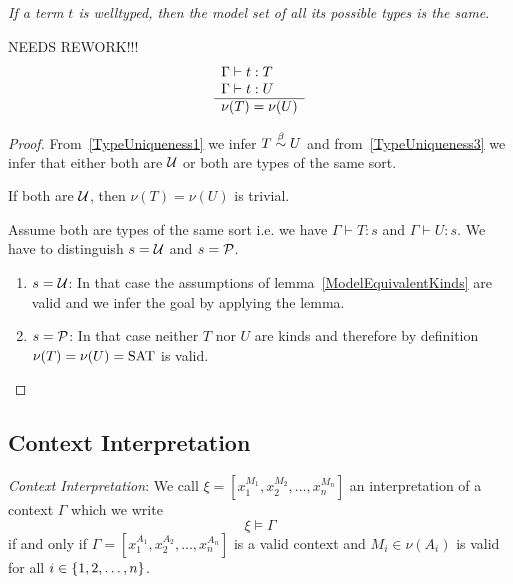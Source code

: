 \begin{theorem}
    \label{ModelAllTypesSame}
    \emph{If a term $t$ is welltyped, then the model set of all its possible
    types is the same}.

    NEEDS REWORK!!!
    $$
    \begin{array}{l} 
        \Gamma \vdash t: T
        \\
        \Gamma \vdash t: U
     \\ \hline 
        \nu(T) = \nu(U)
    \end{array}
    $$

    \begin{proof}
        From~\ref{TypeUniqueness1} we infer $T \stackrel{\beta}{\sim} U$ and
        from~\ref{TypeUniqueness3} we infer that either both are ${\cal U}$ or both
        are types of the same sort.

        If both are ${\cal U}$, then $\nu(T) = \nu(U)$ is trivial.

        Assume both are types of the same sort i.e. we have $\Gamma \vdash T: s$
        and $\Gamma \vdash U: s$. We have to distinguish $s = {\cal U}$ and $s =
        {\cal P}$.

        \begin{enumerate}
        \item $s = {\cal U}$:
            In that case the assumptions of lemma~\ref{ModelEquivalentKinds} are
                valid and we infer the goal by applying the lemma.

        \item $s = {\cal P}$:
            In that case neither $T$ nor $U$ are kinds and therefore by
                definition $\nu(T) = \nu(U) = \text{SAT}$ is valid.
        \end{enumerate}
    \end{proof}
\end{theorem}




\subsection{Context Interpretation}

\begin{definition}
    \emph{Context Interpretation}:
    We call $\xi = [x_1^{M_1}, x_2^{M_2}, \ldots, x_n^{M_n}]$ an interpretation
    of a context $\Gamma$ which we write
    $$
        \xi \vDash \Gamma
    $$
    if and only if $\Gamma = [x_1^{A_1}, x_2^{A_2}, \ldots, x_n^{A_n}]$ is a
    valid context and $M_i \in \nu(A_i)$ is valid for all $i \in {\{1, 2,
    \ldots, n\}}$.
\end{definition}



